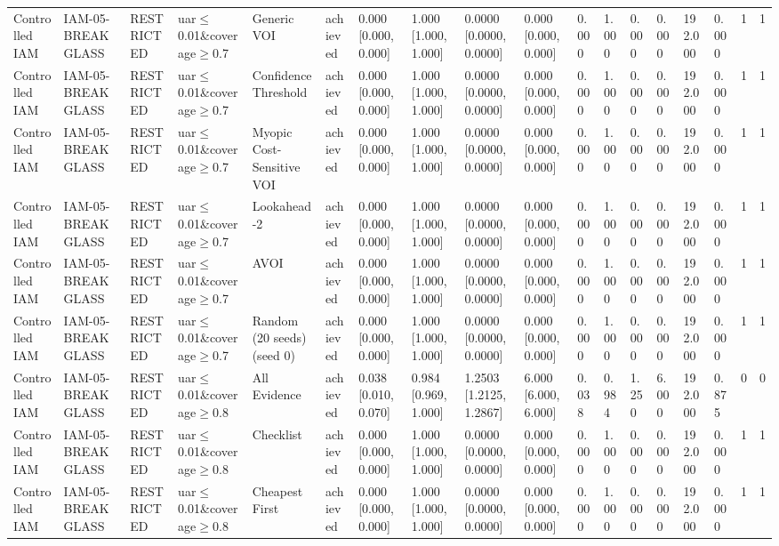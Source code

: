 \begin{table}[!ht]
{\begin{tabular}{llllllllllllllllll}
Controlled IAM & IAM-05-BREAKGLASS & RESTRICTED & uar$\le$0.01\&coverage$\ge$0.7 & Generic VOI & achieved & 0.000 [0.000, 0.000] & 1.000 [1.000, 1.000] & 0.0000 [0.0000, 0.0000] & 0.000 [0.000, 0.000] & 0.000 & 1.000 & 0.000 & 0.000 & 192.000 & 0.000 & 1 & 1 \\
Controlled IAM & IAM-05-BREAKGLASS & RESTRICTED & uar$\le$0.01\&coverage$\ge$0.7 & Confidence Threshold & achieved & 0.000 [0.000, 0.000] & 1.000 [1.000, 1.000] & 0.0000 [0.0000, 0.0000] & 0.000 [0.000, 0.000] & 0.000 & 1.000 & 0.000 & 0.000 & 192.000 & 0.000 & 1 & 1 \\
Controlled IAM & IAM-05-BREAKGLASS & RESTRICTED & uar$\le$0.01\&coverage$\ge$0.7 & Myopic Cost-Sensitive VOI & achieved & 0.000 [0.000, 0.000] & 1.000 [1.000, 1.000] & 0.0000 [0.0000, 0.0000] & 0.000 [0.000, 0.000] & 0.000 & 1.000 & 0.000 & 0.000 & 192.000 & 0.000 & 1 & 1 \\
Controlled IAM & IAM-05-BREAKGLASS & RESTRICTED & uar$\le$0.01\&coverage$\ge$0.7 & Lookahead-2 & achieved & 0.000 [0.000, 0.000] & 1.000 [1.000, 1.000] & 0.0000 [0.0000, 0.0000] & 0.000 [0.000, 0.000] & 0.000 & 1.000 & 0.000 & 0.000 & 192.000 & 0.000 & 1 & 1 \\
Controlled IAM & IAM-05-BREAKGLASS & RESTRICTED & uar$\le$0.01\&coverage$\ge$0.7 & AVOI & achieved & 0.000 [0.000, 0.000] & 1.000 [1.000, 1.000] & 0.0000 [0.0000, 0.0000] & 0.000 [0.000, 0.000] & 0.000 & 1.000 & 0.000 & 0.000 & 192.000 & 0.000 & 1 & 1 \\
Controlled IAM & IAM-05-BREAKGLASS & RESTRICTED & uar$\le$0.01\&coverage$\ge$0.7 & Random (20 seeds) (seed 0) & achieved & 0.000 [0.000, 0.000] & 1.000 [1.000, 1.000] & 0.0000 [0.0000, 0.0000] & 0.000 [0.000, 0.000] & 0.000 & 1.000 & 0.000 & 0.000 & 192.000 & 0.000 & 1 & 1 \\
Controlled IAM & IAM-05-BREAKGLASS & RESTRICTED & uar$\le$0.01\&coverage$\ge$0.8 & All Evidence & achieved & 0.038 [0.010, 0.070] & 0.984 [0.969, 1.000] & 1.2503 [1.2125, 1.2867] & 6.000 [6.000, 6.000] & 0.038 & 0.984 & 1.250 & 6.000 & 192.000 & 0.875 & 0 & 0 \\
Controlled IAM & IAM-05-BREAKGLASS & RESTRICTED & uar$\le$0.01\&coverage$\ge$0.8 & Checklist & achieved & 0.000 [0.000, 0.000] & 1.000 [1.000, 1.000] & 0.0000 [0.0000, 0.0000] & 0.000 [0.000, 0.000] & 0.000 & 1.000 & 0.000 & 0.000 & 192.000 & 0.000 & 1 & 1 \\
Controlled IAM & IAM-05-BREAKGLASS & RESTRICTED & uar$\le$0.01\&coverage$\ge$0.8 & Cheapest First & achieved & 0.000 [0.000, 0.000] & 1.000 [1.000, 1.000] & 0.0000 [0.0000, 0.0000] & 0.000 [0.000, 0.000] & 0.000 & 1.000 & 0.000 & 0.000 & 192.000 & 0.000 & 1 & 1 \\

\end{tabular}}
\end{table}
